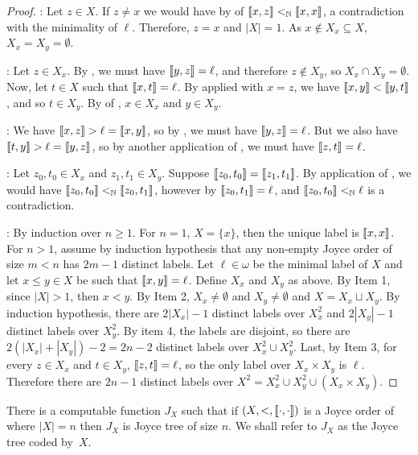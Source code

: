 \begin{proof}
  : Let $z\in X$. If $z\neq x$ we would have by  of  $\llbracket x , z \rrbracket<_{\mathbb{N}}\llbracket x , x \rrbracket$, a contradiction with the minimality of $\ell$. Therefore, $z=x$ and $|X|=1$. As $x\not\in X_x\subseteq X$, $X_x=X_y=\emptyset$.

    : Let $z\in X_x$. By , we must have $\llbracket y , z \rrbracket=\ell$, and therefore $z\not\in X_y$, so $X_x\cap X_y=\emptyset$. Now, let $t\in X$ such that $\llbracket x , t \rrbracket=\ell$. By  applied with $x=z$, we have $\llbracket x , y \rrbracket<\llbracket y , t \rrbracket$, and so $t\in X_y$. By  of , $x \in X_x$ and $y \in X_y$.

    : We have $\llbracket x , z \rrbracket>\ell=\llbracket x , y \rrbracket$, so by , we must have $\llbracket y , z \rrbracket=\ell$. But we also have $\llbracket t , y \rrbracket>\ell=\llbracket y , z \rrbracket$, so by another application of , we must have $\llbracket z , t \rrbracket=\ell$.

    : Let $z_0,t_0\in X_x$ and $z_1,t_1\in X_y$. Suppose $\llbracket z_0 , t_0 \rrbracket=\llbracket z_1 , t_1 \rrbracket$. By application of , we would have $\llbracket z_0 , t_0 \rrbracket<_{\mathbb{N}} \llbracket z_0 , t_1 \rrbracket$, however by  $\llbracket z_0 , t_1 \rrbracket=\ell$, and $\llbracket z_0 , t_0 \rrbracket<_{\mathbb{N}}\ell$ is a contradiction.

: By induction over $n \geq 1$. For $n = 1$, $X = \{x\}$, then the unique label is $\llbracket x , x \rrbracket$. For $n > 1$, assume by induction hypothesis that any non-empty Joyce order of size $m < n$ has $2m-1$ distinct labels. Let $\ell \in \omega$ be the minimal label of $X$ and let $x \leq y \in X$ be such that $\llbracket x , y \rrbracket = \ell$. Define $X_x$ and $X_y$ as above. By Item 1, since $|X| > 1$, then $x < y$. By Item 2, $X_x \neq \emptyset$ and $X_y \neq\emptyset$ and $X = X_x \sqcup X_y$. By induction hypothesis, there are $2|X_x|-1$ distinct labels over $X_x^2$ and $2|X_y|-1$ distinct labels over $X_y^2$. By item 4, the labels are disjoint, so there are $2(|X_x|+|X_y|)-2 = 2n-2$ distinct labels over $X_x^2 \cup X_y^2$. Last, by Item 3, for every $z \in X_x$ and $t \in X_y$, $\llbracket z , t \rrbracket = \ell$, so the only label over $X_x \times X_y$ is $\ell$. Therefore there are $2n-1$ distinct labels over $X^2 = X_x^2 \cup X_y^2 \cup (X_x \times X_y)$.
\end{proof}

\begin{lemma} \label{JOtoJT}
There is a computable function $J_X$ such that if $(X,<,\llbracket \cdot , \cdot \rrbracket)$ is a Joyce order of where $|X| = n$ then $J_X$ is Joyce tree of size $n$. We shall refer to $J_X$ as the Joyce tree coded by~$X$.
\end{lemma}

